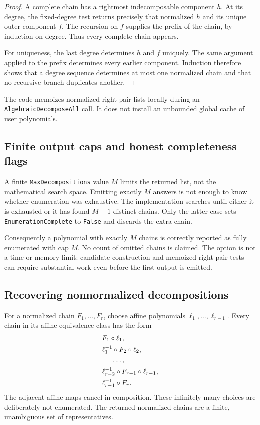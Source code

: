 \documentclass[11pt,letterpaper]{article}
\theoremstyle{definition}
\theoremstyle{remark}
\newcommand{\wt}[1]{\texttt{#1}}
\begin{document}
\begin{proof}
A complete chain has a rightmost indecomposable component $h$. At its
degree, the fixed-degree test returns precisely that normalized $h$ and
its unique outer component $f$. The recursion on $f$ supplies the prefix
of the chain, by induction on degree. Thus every complete chain appears.

For uniqueness, the last degree determines $h$ and $f$ uniquely. The
same argument applied to the prefix determines every earlier component.
Induction therefore shows that a degree sequence determines at most one
normalized chain and that no recursive branch duplicates another.
\end{proof}

The code memoizes normalized right-pair lists locally during an
\wt{AlgebraicDecomposeAll} call. It does not install an unbounded global
cache of user polynomials.

\subsection{Finite output caps and honest completeness flags}
A finite \wt{MaxDecompositions} value $M$ limits the returned list, not
the mathematical search space. Emitting exactly $M$ answers is not enough
to know whether enumeration was exhaustive. The implementation searches
until either it is exhausted or it has found $M+1$ distinct chains.
Only the latter case sets \wt{EnumerationComplete} to \wt{False} and
discards the extra chain.

Consequently a polynomial with exactly $M$ chains is correctly reported
as fully enumerated with cap $M$. No count of omitted chains is claimed.
The option is not a time or memory limit: candidate construction and
memoized right-pair tests can require substantial work even before the
first output is emitted.

\subsection{Recovering nonnormalized decompositions}
For a normalized chain $F_1,\ldots,F_r$, choose affine polynomials
$\ell_1,\ldots,\ell_{r-1}$. Every chain in its affine-equivalence class
has the form
\begin{align*}
 &F_1\circ\ell_1,\\
 &\ell_1^{-1}\circ F_2\circ\ell_2,\\
 &\hspace{1.4em}\ldots,\\
 &\ell_{r-2}^{-1}\circ F_{r-1}\circ\ell_{r-1},\\
 &\ell_{r-1}^{-1}\circ F_r.
\end{align*}
The adjacent affine maps cancel in composition. These infinitely many
choices are deliberately not enumerated. The returned normalized chains
are a finite, unambiguous set of representatives.
\end{document}
